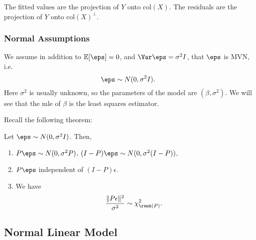 \documentclass[12pt]{article}
\begin{document}
\begin{corollary}
	The fitted values are the projection of $Y$ onto $\mathrm{col}(X)$. The residuals are the projection of $Y$ onto $\mathrm{col}(X)^{\perp}$.
\end{corollary}

\subsubsection{Normal Assumptions}
\label{subsub:normal_assumptions}

We assume in addition to $\mathbb{E}[\eps] = 0$, and $\Var \eps = \sigma^2 I$, that $\eps$ is MVN, i.e.
\[
\eps \sim N(0, \sigma^2 I).
\]
Here $\sigma^2$ is usually unknown, so the parameters of the model are $(\beta, \sigma^2)$. We will see that the mle of $\beta$ is the least squares estimator.



Recall the following theorem:

\begin{theorem}
	Let $\eps \sim N(0, \sigma^2 I)$. Then,
	\begin{enumerate}[\normalfont1.]
		\item $P \eps \sim N(0, \sigma^2 P)$, $(I-P)\eps \sim N(0, \sigma^2(I-P))$,
		\item $P \eps$ independent of $(I - P)\epsilon$.
		\item We have
			\[
				\frac{\|P \epsilon\|^2}{\sigma^2} \sim \chi^2_{\rank(P)}.
			\]
	\end{enumerate}
\end{theorem}

\subsection{Normal Linear Model}
\label{sub:normal_linear_model}
\end{document}
